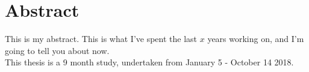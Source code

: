 \chapter{Abstract}

This is my abstract.  This is what I've spent the last $x$ years working on,
and I'm going to tell you about now.\\

This thesis is a 9 month study, undertaken from January 5 - October 14 2018. 
